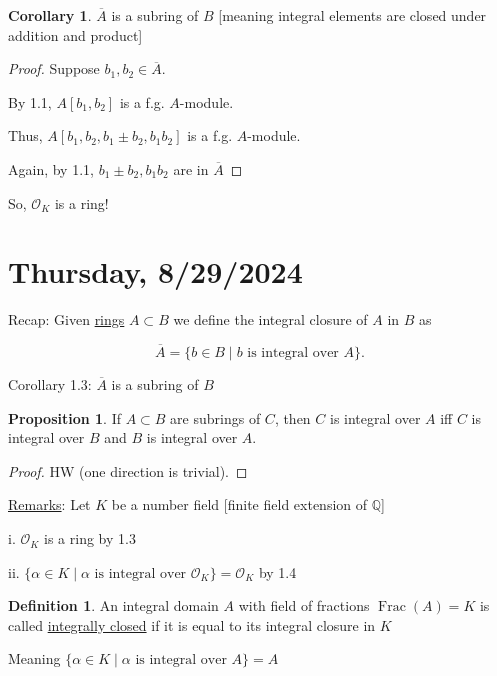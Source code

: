 \documentclass[openany]{amsbook}
\numberwithin{section}{chapter}
\theoremstyle{definition}
\newtheorem*{definition}{Definition}
\newtheorem{proposition}[theorem]{Proposition}
\newtheorem{corollary}[theorem]{Corollary}
\newcommand{\Frac}{\operatorname{Frac}}
\begin{document}
\begin{corollary} \(\overline{A} \) is a subring of \(B\) [meaning integral elements are closed under addition and product]
\end{corollary}

\begin{proof}
    Suppose \(b_1, b_2\in \overline{A}\).

    By 1.1, \(A[b_1, b_2]\) is a f.g. \(A\)-module.

    Thus, \(A[b_1, b_2, b_1 \pm b_2, b_1 b_2]\) is a f.g. \(A\)-module.

    Again, by 1.1, \(b_1 \pm b_2, b_1 b_2\) are in \(\overline{A}\) 
\end{proof}

So, \(\mathcal{O}_K\) is a ring!


\section*{Thursday, 8/29/2024}

Recap: Given \underline{rings} \(A \subset B\) we define the integral closure of $A$ in $B$ as

\[
    \overline{A} = \{ b\in B \mid b \text{ is integral over } A \}.
\]

Corollary 1.3: \(\overline{A}\) is a subring of \(B\)

\begin{proposition}
    If \(A \subset B\) are subrings of \(C\), then \(C\) is integral over \(A\) iff \(C\) is integral over \(B\) and \(B\) is integral over \(A\).
\end{proposition}

\begin{proof}
    HW (one direction is trivial).
\end{proof}

\underline{Remarks}: Let \(K\) be a number field [finite field extension of \(\mathbb{Q}\)]

i. \(\mathcal{O} _K\) is a ring by 1.3

ii. \(\{ \alpha \in K \mid \alpha \text{ is integral over } \mathcal{O}_K \} = \mathcal{O}_K\) by 1.4 

\begin{definition}
    An integral domain \(A\) with field of fractions \(\Frac(A) = K\) is called \underline{integrally closed} if it is equal to its integral closure in \(K\)
    
    Meaning \(\{ \alpha \in K \mid \alpha \text{ is integral over } A \} = A\) 
\end{definition}
\end{document}

